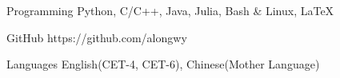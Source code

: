 

\vspace{-1.5mm}
\begin{cvskills}


\cvskill
{Programming} %
{Python, C/C++, Java, Julia, Bash \& Linux, \LaTeX} %


\cvskill
{GitHub} %
{https://github.com/alongwy} %


\cvskill
{Languages} %
{English(CET-4, CET-6), Chinese(Mother Language)} %

\end{cvskills}